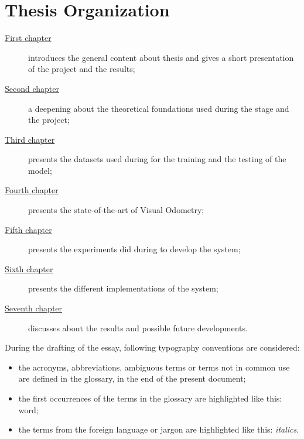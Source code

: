 \section{Thesis Organization}\label{sec:thesis-organization}
\begin{description}
    \item[{\hyperref[ch:introduction]{First chapter}}] introduces the general content about thesis and gives a short presentation of the project and the results;

    \item[{\hyperref[ch:theoretical-foundations]{Second chapter}}] a deepening about the theoretical foundations used during the stage and the project;

    \item[{\hyperref[ch:datasets]{Third chapter}}] presents the datasets used during for the training and the testing of the model;

    \item[{\hyperref[ch:state-of-the-art]{Fourth chapter}}] presents the state-of-the-art of Visual Odometry;

    \item[{\hyperref[ch:experiments]{Fifth chapter}}] presents the experiments did during to develop the system;

    \item[{\hyperref[ch:implementations]{Sixth chapter}}] presents the different implementations of the system;

    \item[{\hyperref[ch:final-discussions]{Seventh chapter}}] discusses about the results and possible future developments.
\end{description}

During the drafting of the essay, following typography conventions are considered:
\begin{itemize}
    \item the acronyms, abbreviations, ambiguous terms or terms not in common use are defined in the glossary, in the end of the present document;
    \item the first occurrences of the terms in the glossary are highlighted like this: \gls{word};
    \item the terms from the foreign language or jargon are highlighted like this: \emph{italics}.
\end{itemize}